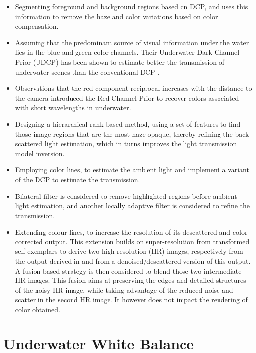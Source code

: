 \documentclass[hidelinks, 12pt]{report}
\begin{document}
\begin{itemize}
\item{Segmenting foreground and background regions based on DCP, and uses this information to remove the haze and color variations based on color compensation.}
\item{Assuming that the predominant source of visual information under the water lies in the blue and green color channels. Their Underwater Dark Channel Prior (UDCP)\cite{trans} has been shown to estimate better the transmission of underwater scenes than the conventional DCP .}
\item{Observations that the red component reciprocal increases with the distance to the camera introduced the Red Channel Prior to recover colors associated with short wavelengths in underwater.}
\item{Designing a hierarchical rank based method, using a set of features to find those image regions that are the most haze-opaque, thereby refining the back-scattered light estimation, which in turns improves the light transmission model inversion.}
\item{Employing color lines\cite{hl}, \cite{rf} to estimate the ambient light and implement a variant of the DCP to estimate the transmission.}
\item{Bilateral filter is considered to remove highlighted regions before ambient light estimation, and another locally adaptive filter is considered to refine the transmission.}
\item{Extending colour lines\cite{hl}, \cite{rf} to increase the resolution of its descattered and color-corrected output. This extension builds on super-resolution from transformed self-exemplars to derive two high-resolution (HR) images, respectively from the output derived in and from a denoised/descattered version of this output. A fusion-based strategy is then considered to blend those two intermediate HR images. This fusion aims at preserving the edges and detailed structures of the noisy HR image, while taking advantage of the reduced noise and scatter in the second HR image. It however does not impact the rendering of color obtained.\cite{hl}}
\end{itemize}
\chapter{Underwater White Balance}
\fancyhf{}
\fancyhead[r]{%
   \itshape
\footnotesize{\chaptermark}
   \leftmark}
\end{document}
